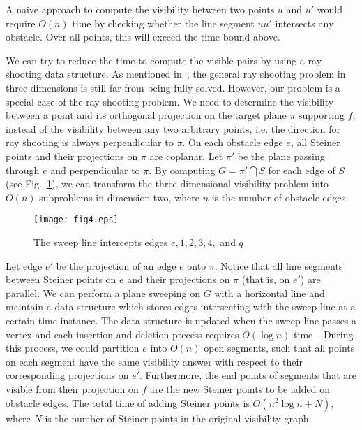 \documentclass{llncs}
\begin{document}
A naive approach to compute the visibility between two points $u$ and $u'$
would require $O(n)$ time by checking whether the line segment $uu'$ intersects any obstacle.
Over all points, this will exceed the time bound above.

We can try to reduce the time to compute the visible pairs by using a ray shooting data structure.
As mentioned in~\cite{Shar03}, the general ray shooting problem in three dimensions is still far
from being fully solved.
However, our problem is a special case of the ray shooting problem. We need to determine the visibility
between a point and its orthogonal projection on the target plane $\pi$ supporting $f$, instead of the
visibility between any two arbitrary points, i.e. the direction for ray shooting is always perpendicular
to $\pi$. On each obstacle edge $e$, all Steiner points and their projections on $\pi$ are coplanar.
Let $\pi'$ be the plane passing through $e$ and perpendicular to $\pi$. By computing
$G=\pi' \bigcap S$ for each edge of $S$ (see Fig.~\ref{Fig-2d}), we can transform the three dimensional
visibility problem
into $O(n)$ subproblems in dimension two, where $n$ is the number of obstacle edges.

\begin{figure}\begin{center}
    \leavevmode
\texttt{[image: fig4.eps]}
    \caption{The sweep line intercepts edges $e,1,2,3,4,$ and $q$}
    \label{Fig-2d}
    \end{center}
\end{figure}

Let edge $e'$ be the projection of an edge $e$ onto $\pi$.
Notice that all line segments between Steiner points on $e$
and their projections on $\pi$ (that is, on $e'$) are parallel. We can perform a plane sweeping on $G$
with a horizontal line and maintain a data structure which stores edges intersecting with the sweep line
at a certain time instance. The data structure is updated when
the sweep line passes a vertex and
each insertion and deletion precess requires $O(\log n)$ time~\cite{shamos}. During this process,
we could partition
$e$ into $O(n)$ open segments, such that all points on each segment have the same visibility answer
with respect to their corresponding
projections on $e'$. Furthermore, the end points of segments that are visible from their projection on $f$ are the new Steiner points to be added on obstacle edges. The total time of adding Steiner points is $O(n^2\log n+N)$, where $N$ is the number of Steiner points in the original visibility graph.
\end{document}
